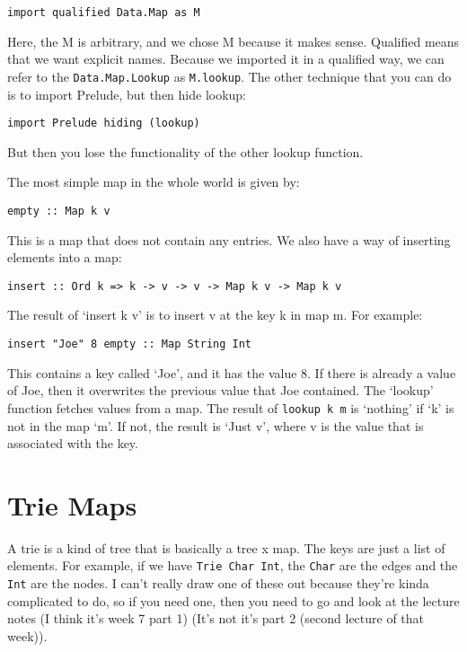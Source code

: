 \documentclass[11pt,a4paper,titlepage]{scrartcl}
\begin{document}
\begin{lstlisting}
import qualified Data.Map as M
\end{lstlisting}

Here, the M is arbitrary, and we chose M because it makes sense. Qualified
means that we want explicit names. Because we imported it in a qualified
way, we can refer to the \lstinline|Data.Map.Lookup| as
\lstinline|M.lookup|. The other technique that you can do is to import
Prelude, but then hide lookup:
\begin{lstlisting}
import Prelude hiding (lookup)
\end{lstlisting}

But then you lose the functionality of the other lookup function.

The most simple map in the whole world is given by:
\begin{lstlisting}
empty :: Map k v
\end{lstlisting}

This is a map that does not contain any entries. We also have a way of
inserting elements into a map:

\begin{lstlisting}
insert :: Ord k => k -> v -> v -> Map k v -> Map k v
\end{lstlisting}
The result of `insert k v' is to insert v at the key k in map m. For
example:
\begin{lstlisting}
insert "Joe" 8 empty :: Map String Int
\end{lstlisting}

This contains a key called `Joe', and it has the value 8. If there is
already a value of Joe, then it overwrites the previous value that Joe
contained. The `lookup' function fetches values from a map. The result of
\lstinline|lookup k m| is `nothing' if `k' is not in the map `m'. If not,
the result is `Just v', where v is the value that is associated with the
key.

\section{Trie Maps}%
\label{sec:tries}
A trie is a kind of tree that is basically a tree x map. The keys are just
a list of elements. For example, if we have \lstinline|Trie Char Int|, the
\lstinline|Char| are the edges and the \lstinline|Int| are the nodes. I
can't really draw one of these out because they're kinda complicated to
do, so if you need one, then you need to go and look at the lecture notes
(I think it's week 7 part 1) (It's not it's part 2 (second lecture of that
week)).
\end{document}
